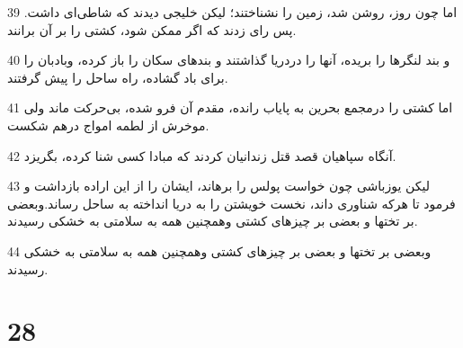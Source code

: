 \par 39 اما چون روز، روشن شد، زمین را نشناختند؛ لیکن خلیجی دیدند که شاطی‌ای داشت. پس رای زدند که اگر ممکن شود، کشتی را بر آن برانند.
\par 40 و بند لنگرها را بریده، آنها را دردریا گذاشتند و بندهای سکان را باز کرده، وبادبان را برای باد گشاده، راه ساحل را پیش گرفتند.
\par 41 اما کشتی را درمجمع بحرین به پایاب رانده، مقدم آن فرو شده، بی‌حرکت ماند ولی موخرش از لطمه امواج درهم شکست.
\par 42 آنگاه سپاهیان قصد قتل زندانیان کردند که مبادا کسی شنا کرده، بگریزد.
\par 43 لیکن یوزباشی چون خواست پولس را برهاند، ایشان را از این اراده بازداشت و فرمود تا هر‌که شناوری داند، نخست خویشتن را به دریا انداخته به ساحل رساند.وبعضی بر تختها و بعضی بر چیزهای کشتی وهمچنین همه به سلامتی به خشکی رسیدند.
\par 44 وبعضی بر تختها و بعضی بر چیزهای کشتی وهمچنین همه به سلامتی به خشکی رسیدند.

\chapter{28}

